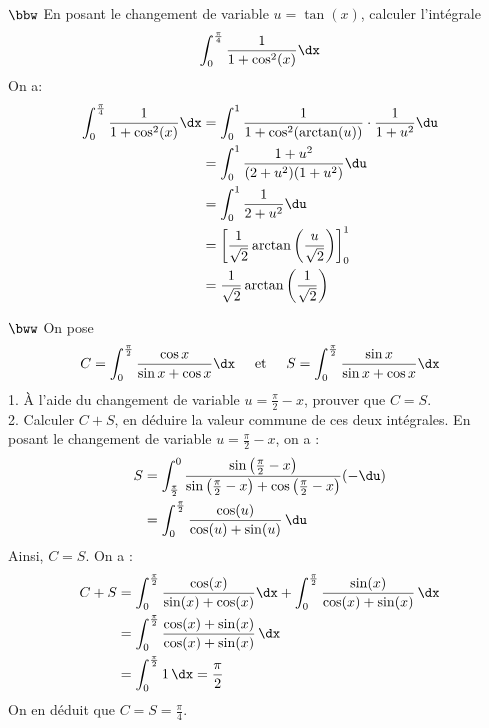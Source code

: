 \documentclass[11pt]{article}
\begin{document}
\begin{exercice}{$\bbw$}{}
    En posant le changement de variable $u=\tan(x)$, calculer l'intégrale
    \begin{align*}
        \int_0^{\frac{\pi}{4}}{\frac{1}{1+\cos^2(x)}\dx}
    \end{align*}
    \tcblower
    On a:
    \begin{align*}
        \int_0^{\frac{\pi}{4}}{\frac{1}{1+\cos^2(x)}\dx}
        &=\int_0^1{\frac{1}{1+\cos^2(\arctan(u))}\cdot\frac{1}{1+u^2}\du}\\
        &=\int_0^1{\frac{1+u^2}{(2+u^2)(1+u^2)}\du}\\
        &=\int_0^1{\frac{1}{2+u^2}\du}\\
        &=\left[\frac{1}{\sqrt{2}}\arctan\left(\frac{u}{\sqrt{2}}\right)\right]_0^1\\
        &=\frac{1}{\sqrt{2}}\arctan\left(\frac{1}{\sqrt{2}}\right)\\
    \end{align*}
\end{exercice}

\pagebreak

\begin{exercice}{$\bww$}{}
    On pose
    \begin{equation*}
        C=\int_0^{\frac{\pi}{2}}{\frac{\cos x}{\sin x + \cos x}\dx} \hspace{0.5cm} \text{et} \hspace{0.5cm} S=\int_0^{\frac{\pi}{2}}{\frac{\sin x}{\sin x + \cos x}\dx}
    \end{equation*}
    1. À l'aide du changement de variable $u=\frac{\pi}{2}-x$, prouver que $C=S$.\\
    2. Calculer $C + S$, en déduire la valeur commune de ces deux intégrales.
    \tcblower
     En posant le changement de variable $u = \frac{\pi}{2} - x$, on a :
    \begin{align*}
    S &= \int_{\frac{\pi}{2}}^{0} \frac{\sin\left(\frac{\pi}{2} - x\right)}{\sin\left(\frac{\pi}{2} - x\right) + \cos\left(\frac{\pi}{2} - x\right)} (-\du) \\
    &= \int_{0}^{\frac{\pi}{2}} \frac{\cos(u)}{\cos(u) + \sin(u)} \, \du\\
    \end{align*}
    Ainsi, $C = S$.\n
     On a :
    \begin{align*}
        C + S &= \int_{0}^{\frac{\pi}{2}} \frac{\cos(x)}{\sin(x) + \cos(x)}\dx + \int_{0}^{\frac{\pi}{2}} \frac{\sin(x)}{\cos(x) + \sin(x)} \, \dx\\
        &= \int_{0}^{\frac{\pi}{2}} \frac{\cos(x) + \sin(x)}{\cos(x) + \sin(x)} \,\dx\\
        &= \int_{0}^{\frac{\pi}{2}} 1 \, \dx = \frac{\pi}{2}
    \end{align*}
    On en déduit que $C = S = \frac{\pi}{4}$.
\end{exercice}
\end{document}
